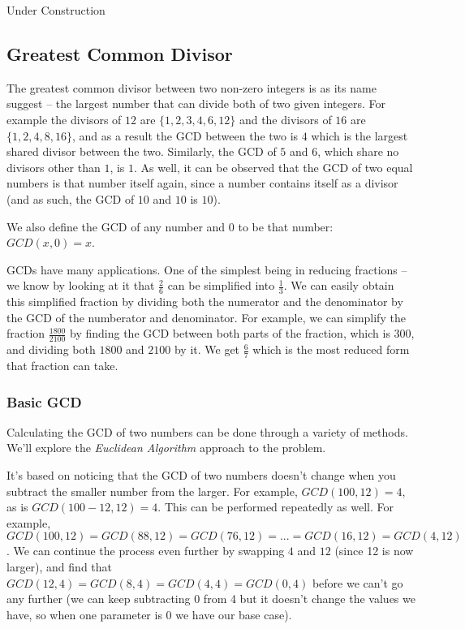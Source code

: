 Under Construction

\subsection{Greatest Common Divisor}

The greatest common divisor between two non-zero integers is as its name suggest -- the largest number that can divide both of two given integers. For example the divisors of $12$ are $\{1,2,3,4,6,12\}$ and the divisors of $16$ are $\{1,2,4,8,16\}$, and as a result the GCD between the two is $4$ which is the largest shared divisor between the two. Similarly, the GCD of $5$ and $6$, which share no divisors other than $1$, is $1$. As well, it can be observed that the GCD of two equal numbers is that number itself again, since a number contains itself as a divisor (and as such, the GCD of $10$ and $10$ is $10$).

We also define the GCD of any number and 0 to be that number: $GCD(x,0) = x$.

GCDs have many applications. One of the simplest being in reducing fractions -- we know by looking at it that $\frac{2}{6}$ can be simplified into $\frac{1}{3}$. We can easily obtain this simplified fraction by dividing both the numerator and the denominator by the GCD of the numberator and denominator. For example, we can simplify the fraction $\frac{1800}{2100}$ by finding the GCD between both parts of the fraction, which is 300, and dividing both $1800$ and $2100$ by it. We get $\frac{6}{7}$ which is the most reduced form that fraction can take.

\subsubsection{Basic GCD}

Calculating the GCD of two numbers can be done through a variety of methods. We'll explore the \textit{Euclidean Algorithm} approach to the problem.

It's based on noticing that the GCD of two numbers doesn't change when you subtract the smaller number from the larger. For example, $GCD(100, 12) = 4$, as is $GCD(100-12, 12) = 4$. This can be performed repeatedly as well. For example, $GCD(100, 12) = GCD(88, 12) = GCD(76, 12) = ... = GCD(16, 12) = GCD(4, 12)$. We can continue the process even further by swapping $4$ and $12$ (since 12 is now larger), and find that $GCD(12, 4) = GCD(8, 4) = GCD(4, 4) = GCD(0, 4)$ before we can't go any further (we can keep subtracting 0 from 4 but it doesn't change the values we have, so when one parameter is 0 we have our base case).

